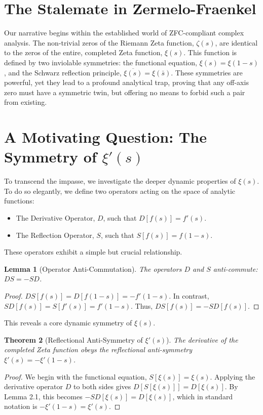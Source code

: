 \documentclass{article}
\theoremstyle{plain}
\newtheorem{theorem}{Theorem}[section]
\newtheorem{lemma}[theorem]{Lemma}
\theoremstyle{definition}
\theoremstyle{remark}
\begin{document}
\section{The Stalemate in Zermelo-Fraenkel}
\label{sec:stalemate}
Our narrative begins within the established world of ZFC-compliant complex analysis. The non-trivial zeros of the Riemann Zeta function, $\zeta(s)$, are identical to the zeros of the entire, completed Zeta function, $\xi(s)$. This function is defined by two inviolable symmetries: the functional equation, $\xi(s) = \xi(1-s)$, and the Schwarz reflection principle, $\overline{\xi(s)} = \xi(\bar{s})$. These symmetries are powerful, yet they lead to a profound analytical trap, proving that any off-axis zero must have a symmetric twin, but offering no means to forbid such a pair from existing.

\section{A Motivating Question: The Symmetry of \texorpdfstring{$\xi'(s)$}{xi'(s)}}
\label{sec:question}
To transcend the impasse, we investigate the deeper dynamic properties of $\xi(s)$. To do so elegantly, we define two operators acting on the space of analytic functions:
\begin{itemize}
    \item The Derivative Operator, $D$, such that $D[f(s)] = f'(s)$.
    \item The Reflection Operator, $S$, such that $S[f(s)] = f(1-s)$.
\end{itemize}
These operators exhibit a simple but crucial relationship.

\begin{lemma}[Operator Anti-Commutation]
The operators $D$ and $S$ anti-commute: $DS = -SD$.
\end{lemma}
\begin{proof}
$DS[f(s)] = D[f(1-s)] = -f'(1-s)$. In contrast, $SD[f(s)] = S[f'(s)] = f'(1-s)$. Thus, $DS[f(s)] = -SD[f(s)]$.
\end{proof}

This reveals a core dynamic symmetry of $\xi(s)$.
\begin{theorem}[Reflectional Anti-Symmetry of $\xi'(s)$]
\label{thm:anti_symmetry}
The derivative of the completed Zeta function obeys the reflectional anti-symmetry $\xi'(s) = -\xi'(1-s)$.
\end{theorem}
\begin{proof}
We begin with the functional equation, $S[\xi(s)] = \xi(s)$. Applying the derivative operator $D$ to both sides gives $D[S[\xi(s)]] = D[\xi(s)]$. By Lemma 2.1, this becomes $-SD[\xi(s)] = D[\xi(s)]$, which in standard notation is $-\xi'(1-s) = \xi'(s)$.
\end{proof}
\end{document}
